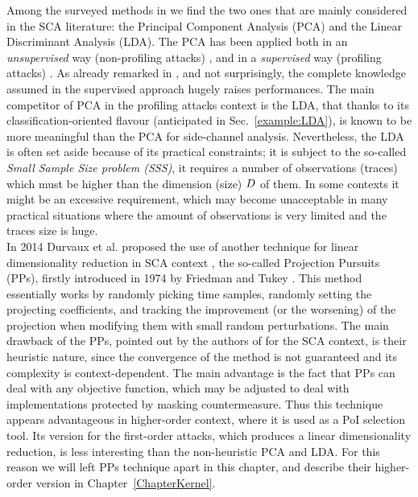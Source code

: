 Among the surveyed methods in \cite{cunningham2015linear} we find the two ones that are mainly considered in the SCA literature: the Principal Component Analysis (PCA) and the Linear Discriminant Analysis (LDA). The PCA has been applied both in an {\em unsupervised} way (\ie non-profiling attacks) \cite{karsmakers2009side,Batina2012}, and in a {\em supervised} way (\ie profiling attacks) \cite{TAprincipal,Standaert2008,disassembler,choudaryefficient,choudary2014efficient}. As already remarked in \cite{disassembler}, and not surprisingly, the complete knowledge assumed in the supervised approach hugely raises performances. The main competitor of PCA in the profiling attacks context is the LDA, that thanks to its classification-oriented flavour (anticipated in Sec.~\ref{example:LDA}), is known to be more meaningful \cite{lessIsMore,Standaert2008} than the PCA for side-channel analysis. Nevertheless, the LDA is often set aside because of its practical constraints; it is subject to the so-called {\em Small Sample Size problem (SSS)}, \ie it requires a number of observations (traces) which must be higher than the dimension (size) $D$ of them. In some contexts it might be an excessive requirement, which may become unacceptable in many practical situations where the amount of observations is very limited and the traces size is huge.\\

In 2014 Durvaux et al. proposed the use of another technique for linear dimensionality reduction in SCA context \cite{PP}, the so-called Projection Pursuits (PPs), firstly introduced in 1974 by Friedman and Tukey \cite{friedman1974projection}. This method essentially works by randomly picking time samples, randomly setting the projecting coefficients, and tracking the improvement (or the worsening) of the projection when modifying
them with small random perturbations. The main drawback of the PPs, pointed out by the authors of \cite{PP} for the SCA context, is their heuristic nature,
since the convergence of the method is not guaranteed and its complexity is
context-dependent. The main advantage is the fact that
PPs can deal with any objective function, which may be adjusted to deal with implementations protected by masking countermeasure. Thus this technique appears advantageous in higher-order context, where it is used as a PoI selection tool. Its version for the first-order attacks, which produces a linear dimensionality reduction, is less interesting than the non-heuristic PCA and LDA. For this reason we will left PPs technique apart in this chapter, and describe their higher-order version in Chapter~\ref{ChapterKernel}.\\

